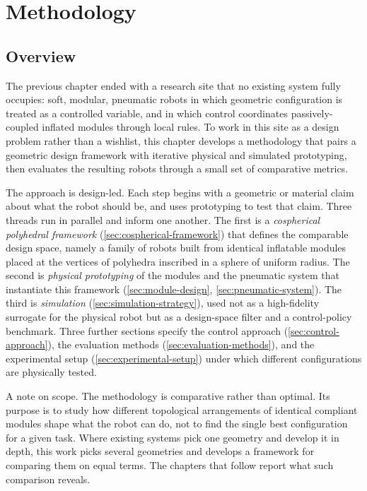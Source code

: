 \chapter{Methodology}
\label{ch:methodology}

\section{Overview}
\label{sec:method-overview}

The previous chapter ended with a research site that no existing system fully occupies: soft, modular, pneumatic robots in which geometric configuration is treated as a controlled variable, and in which control coordinates passively-coupled inflated modules through local rules. To work in this site as a design problem rather than a wishlist, this chapter develops a methodology that pairs a geometric design framework with iterative physical and simulated prototyping, then evaluates the resulting robots through a small set of comparative metrics.

The approach is design-led. Each step begins with a geometric or material claim about what the robot should be, and uses prototyping to test that claim. Three threads run in parallel and inform one another. The first is a \textit{cospherical polyhedral framework} (\cref{sec:cospherical-framework}) that defines the comparable design space, namely a family of robots built from identical inflatable modules placed at the vertices of polyhedra inscribed in a sphere of uniform radius. The second is \textit{physical prototyping} of the modules and the pneumatic system that instantiate this framework (\cref{sec:module-design}, \cref{sec:pneumatic-system}). The third is \textit{simulation} (\cref{sec:simulation-strategy}), used not as a high-fidelity surrogate for the physical robot but as a design-space filter and a control-policy benchmark. Three further sections specify the control approach (\cref{sec:control-approach}), the evaluation methods (\cref{sec:evaluation-methods}), and the experimental setup (\cref{sec:experimental-setup}) under which different configurations are physically tested.

A note on scope. The methodology is comparative rather than optimal. Its purpose is to study how different topological arrangements of identical compliant modules shape what the robot can do, not to find the single best configuration for a given task. Where existing systems pick one geometry and develop it in depth, this work picks several geometries and develops a framework for comparing them on equal terms. The chapters that follow report what such comparison reveals.
